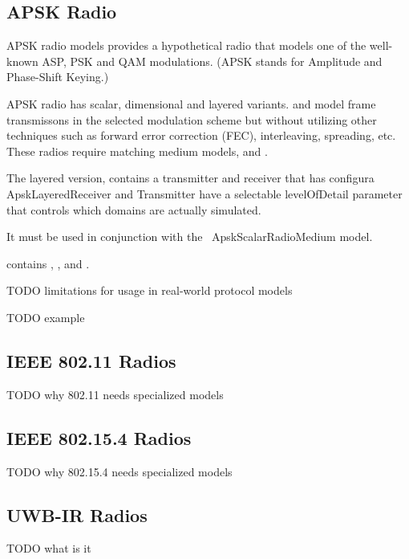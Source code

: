 \subsection{APSK Radio}

APSK radio models provides a hypothetical radio that models 
one of the well-known ASP, PSK and QAM modulations. 
(APSK stands for Amplitude and Phase-Shift Keying.)

APSK radio has scalar, dimensional and layered variants.
 and 
model frame transmissons in the selected modulation scheme
but without utilizing other techniques such as forward error 
correction (FEC), interleaving, spreading, etc. These radios
require matching medium models, 
and .

The layered version,  contains
a transmitter and receiver that has configura
ApskLayeredReceiver and Transmitter have a selectable levelOfDetail 
parameter that controls which domains are actually simulated.


It must be used in conjunction with the ~ApskScalarRadioMedium model.
 
 contains ,
, and .


TODO limitations for usage in real-world protocol models

TODO example


\subsection{IEEE 802.11 Radios}

TODO why 802.11 needs specialized models 

\subsection{IEEE 802.15.4 Radios}

TODO why 802.15.4 needs specialized models 

\subsection{UWB-IR Radios}

TODO what is it




